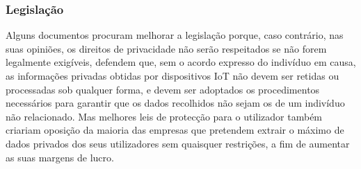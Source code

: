 \documentclass[conference]{IEEEtran}
\begin{document}

\subsubsection{Legislação}

Alguns documentos procuram melhorar a legislação \cite{WEBER2015618, FabianoInternet}
porque, caso contrário, nas suas opiniões, os direitos de privacidade não serão
respeitados se não forem legalmente exigíveis, defendem que, sem o acordo expresso
do indivíduo em causa, as informações privadas obtidas por dispositivos IoT
não devem ser retidas ou processadas sob qualquer forma, e devem ser adoptados
os procedimentos necessários para garantir que os dados recolhidos não sejam
os de um indivíduo não relacionado. Mas melhores leis de protecção para o utilizador
também criariam oposição da maioria das empresas que pretendem extrair o máximo
de dados privados dos seus utilizadores sem quaisquer restrições, a fim de
aumentar as suas margens de lucro.

\end{document}
